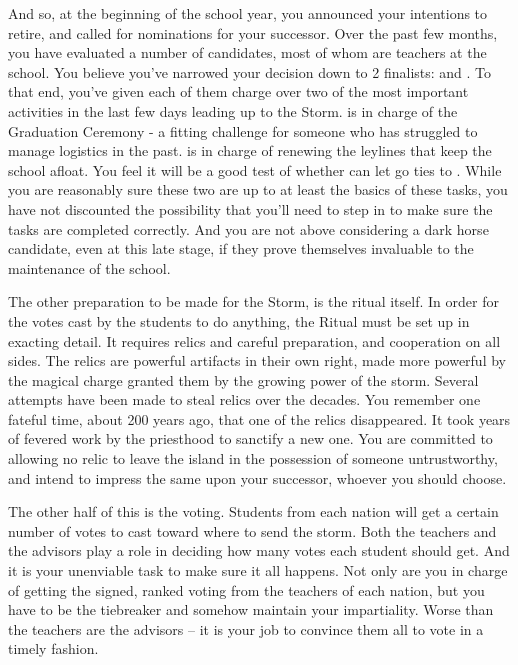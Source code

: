 \documentclass[char]{GL2020}
\begin{document}
And so, at the beginning of the school year, you announced your intentions to retire, and called for nominations for your successor. Over the past few months, you have evaluated a number of candidates, most of whom are teachers at the school. You believe you’ve narrowed your decision down to 2 finalists: \cMusic{} and \cBeetle{}. To that end, you’ve given each of them charge over two of the most important activities in the last few days leading up to the Storm. \cMusic{} is in charge of the Graduation Ceremony - a fitting challenge for someone who has struggled to manage logistics in the past. \cBeetle{} is in charge of renewing the leylines that keep the school afloat. You feel it will be a good test of whether \cBeetle{\they} can let go \cBeetle{\their} ties to \pTech{}. While you are reasonably sure these two are up to at least the basics of these tasks, you have not discounted the possibility that you’ll need to step in to make sure the tasks are completed correctly. And you are not above considering a dark horse candidate, even at this late stage, if they prove themselves invaluable to the maintenance of the school.

The other preparation to be made for the Storm, is the ritual itself. In order for the votes cast by the students to do anything, the Ritual must be set up in exacting detail. It requires relics and careful preparation, and cooperation on all sides. The relics are powerful artifacts in their own right, made more powerful by the magical charge granted them by the growing power of the storm. Several attempts have been made to steal relics over the decades. You remember one fateful time, about 200 years ago, that one of the \pFarm{} relics disappeared. It took years of fevered work by the priesthood to sanctify a new one. You are committed to allowing no relic to leave the island in the possession of someone untrustworthy, and intend to impress the same upon your successor, whoever you should choose.

The other half of this is the voting. Students from each nation will get a certain number of votes to cast toward where to send the storm. Both the teachers and the advisors play a role in deciding how many votes each student should get. And it is your unenviable task to make sure it all happens. Not only are you in charge of getting the signed, ranked voting from the teachers of each nation, but you have to be the tiebreaker and somehow maintain your impartiality. Worse than the teachers are the advisors -- it is your job to convince them all to vote in a timely fashion.
\end{document}
